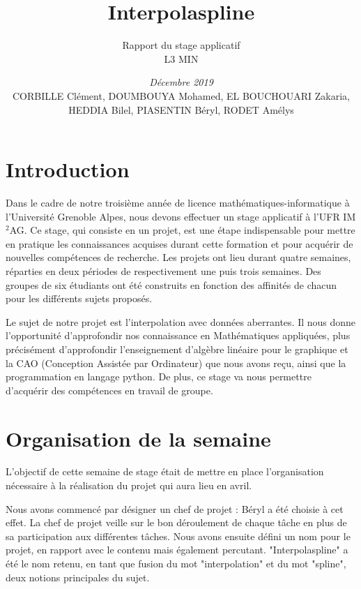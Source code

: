 \documentclass[a4paper,10pt]{article} %
\title{\textbf{Interpolaspline}}
\author{Rapport du stage applicatif\\ L3 MIN}
\date{\emph{Décembre 2019}\\CORBILLE Clément, DOUMBOUYA Mohamed, EL BOUCHOUARI Zakaria, HEDDIA Bilel, PIASENTIN Béryl, RODET Amélys}
\begin{document}

\maketitle %
\tableofcontents %

\newpage

\section*{Introduction}
Dans le cadre de notre troisième année de licence mathématiques-informatique à l’Université Grenoble Alpes, nous devons effectuer un stage applicatif à l’UFR IM$^2$AG. Ce stage, qui consiste en un projet, est une étape indispensable pour mettre en pratique les connaissances acquises durant cette formation et pour acquérir de nouvelles compétences de recherche. Les projets ont lieu durant quatre semaines, réparties en deux périodes de respectivement une puis trois semaines. Des groupes de six étudiants ont été construits en fonction des affinités de chacun pour les différents sujets proposés.

Le sujet de notre projet est l'interpolation avec données aberrantes. Il nous donne l’opportunité d’approfondir nos connaissance en Mathématiques appliquées, plus précisément d'approfondir l'enseignement d'algèbre linéaire pour le graphique et la CAO (Conception Assistée par Ordinateur) que nous avons reçu, ainsi que la programmation en langage  python. De plus, ce stage va nous permettre d'acquérir des compétences en travail de groupe.

\section{Organisation de la semaine}

L'objectif de cette semaine de stage était de mettre en place l'organisation nécessaire à la réalisation du projet qui aura lieu en avril.

Nous avons commencé par désigner un chef de projet : Béryl a été choisie à cet effet. La chef de projet veille sur le bon déroulement de chaque tâche en plus de sa participation aux différentes tâches. Nous avons ensuite défini un nom pour le projet, en rapport avec le contenu mais également percutant. "Interpolaspline" a été le nom retenu, en tant que fusion du mot "interpolation" et du mot "spline", deux notions principales du sujet.
\end{document}
